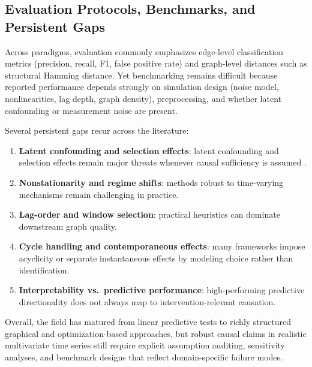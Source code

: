 \documentclass[11pt]{article}
\begin{document}
\subsection{Evaluation Protocols, Benchmarks, and Persistent Gaps}
Across paradigms, evaluation commonly emphasizes edge-level classification metrics (precision, recall, F1, false positive rate) and graph-level distances such as structural Hamming distance. Yet benchmarking remains difficult because reported performance depends strongly on simulation design (noise model, nonlinearities, lag depth, graph density), preprocessing, and whether latent confounding or measurement noise are present.

Several persistent gaps recur across the literature:
\begin{enumerate}
  \item \textbf{Latent confounding and selection effects}: latent confounding and selection effects remain major threats whenever causal sufficiency is assumed \citep{pearl2000,spirtes2000}.
  \item \textbf{Nonstationarity and regime shifts}: methods robust to time-varying mechanisms remain challenging in practice.
  \item \textbf{Lag-order and window selection}: practical heuristics can dominate downstream graph quality.
  \item \textbf{Cycle handling and contemporaneous effects}: many frameworks impose acyclicity or separate instantaneous effects by modeling choice rather than identification.
  \item \textbf{Interpretability vs.\ predictive performance}: high-performing predictive directionality does not always map to intervention-relevant causation.
\end{enumerate}

Overall, the field has matured from linear predictive tests to richly structured graphical and optimization-based approaches, but robust causal claims in realistic multivariate time series still require explicit assumption auditing, sensitivity analyses, and benchmark designs that reflect domain-specific failure modes.



\end{document}
